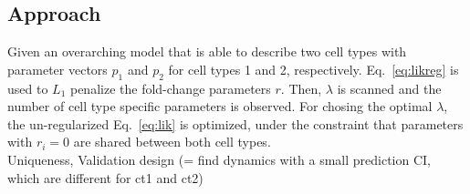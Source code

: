 \documentclass{bioinfo}
\begin{document}


\begin{methods}
\section{Approach}
Given an overarching model that is able to describe two cell types with parameter vectors $p_1$ and $p_2$ for cell types 1 and 2, respectively.
Eq.~\ref{eq:likreg} is used to $L_1$ penalize the fold-change parameters $r$.
Then, $\lambda$ is scanned and the number of cell type specific parameters is observed.
For chosing the optimal $\lambda$, the un-regularized Eq.~\ref{eq:lik} is optimized, under the constraint that parameters with $r_i = 0$ are shared between both cell types.\\
Uniqueness, Validation design (= find dynamics with a small prediction CI, which are different for ct1 and ct2)\\ \\
%
%
%
%

\end{methods}
\end{document}

